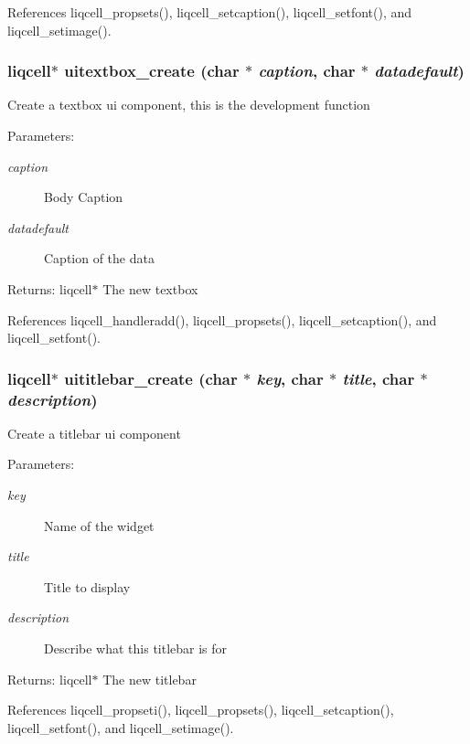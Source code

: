 References liqcell\_\-propsets(), liqcell\_\-setcaption(), liqcell\_\-setfont(), and liqcell\_\-setimage().
\subsubsection[{uitextbox\_\-create}]{\setlength{\rightskip}{0pt plus 5cm}liqcell$\ast$ uitextbox\_\-create (char $\ast$ {\em caption}, \/  char $\ast$ {\em datadefault})}\label{de/d77/liqui_8c_273dd56d07ae59d2edab1b55a8f082d8}


Create a textbox ui component, this is the development function \begin{Desc}
\item[Parameters:]
\begin{description}
\item[{\em caption}]Body Caption \item[{\em datadefault}]Caption of the data \end{description}
\end{Desc}
\begin{Desc}
\item[Returns:]liqcell$\ast$ The new textbox \end{Desc}


References liqcell\_\-handleradd(), liqcell\_\-propsets(), liqcell\_\-setcaption(), and liqcell\_\-setfont().
\subsubsection[{uititlebar\_\-create}]{\setlength{\rightskip}{0pt plus 5cm}liqcell$\ast$ uititlebar\_\-create (char $\ast$ {\em key}, \/  char $\ast$ {\em title}, \/  char $\ast$ {\em description})}\label{de/d77/liqui_8c_7910151050e0bc587b2f20e6ecafbf3a}


Create a titlebar ui component \begin{Desc}
\item[Parameters:]
\begin{description}
\item[{\em key}]Name of the widget \item[{\em title}]Title to display \item[{\em description}]Describe what this titlebar is for \end{description}
\end{Desc}
\begin{Desc}
\item[Returns:]liqcell$\ast$ The new titlebar \end{Desc}


References liqcell\_\-propseti(), liqcell\_\-propsets(), liqcell\_\-setcaption(), liqcell\_\-setfont(), and liqcell\_\-setimage().